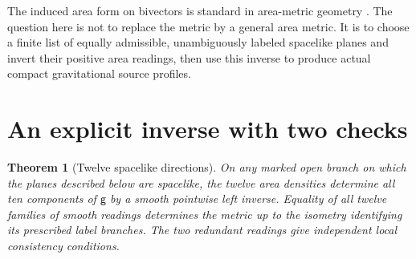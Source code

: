 \documentclass[11pt]{article}
\newtheorem{theorem}{Theorem}\newtheorem{proposition}[theorem]{Proposition}
\newcommand{\gmark}{\mathsf g}
\begin{document}
The induced area form on bivectors is standard in area-metric geometry \cite{SW}. The question here is not to replace the metric by a general area metric. It is to choose a finite list of equally admissible, unambiguously labeled spacelike planes and invert their positive area readings, then use this inverse to produce actual compact gravitational source profiles.

\section{An explicit inverse with two checks}
\begin{theorem}[Twelve spacelike directions]\label{T12}
On any marked open branch on which the planes described below are spacelike, the twelve area densities determine all ten components of \(\gmark\) by a smooth pointwise left inverse. Equality of all twelve families of smooth readings determines the metric up to the isometry identifying its prescribed label branches. The two redundant readings give independent local consistency conditions.
\end{theorem}
\end{document}
